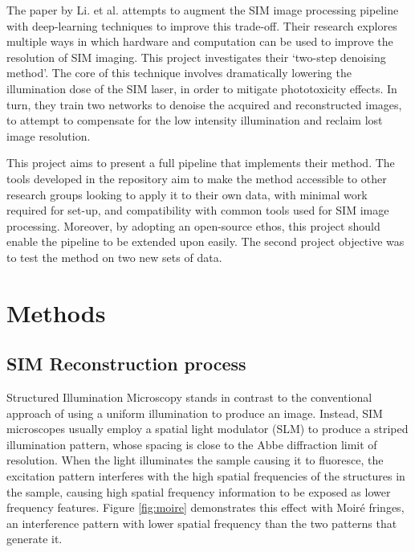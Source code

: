 \documentclass[12pt]{article}
\begin{document}
The paper by Li. et al. \cite{keypaper} attempts to augment the SIM image processing pipeline with deep-learning techniques to improve this trade-off.
Their research explores multiple ways in which hardware and computation can be used to improve the resolution of SIM imaging.
This project investigates their `two-step denoising method'.
The core of this technique involves dramatically lowering the illumination dose of the SIM laser,
in order to mitigate phototoxicity effects.
In turn, they train two networks to denoise the acquired and reconstructed images,
to attempt to compensate for the low intensity illumination and reclaim lost image resolution.

This project aims to present a full pipeline that implements their method.
The tools developed in the repository aim to make the method accessible to other research groups looking to apply it to their own data,
with minimal work required for set-up, and compatibility with common tools used for SIM image processing.
Moreover, by adopting an open-source ethos, this project should enable the pipeline to be extended upon easily.
The second project objective was to test the method on two new sets of data.

\section{Methods}

\subsection{SIM Reconstruction process}

Structured Illumination Microscopy stands in contrast to the conventional approach of using a uniform illumination to produce an image.
Instead, SIM microscopes usually employ a spatial light modulator (SLM) to produce a striped illumination pattern,
whose spacing is close to the Abbe diffraction limit of resolution.
When the light illuminates the sample causing it to fluoresce,
the excitation pattern interferes with the high spatial frequencies of the structures in the sample,
causing high spatial frequency information to be exposed as lower frequency features.
Figure \ref{fig:moire} demonstrates this effect with Moir\'{e} fringes,
an interference pattern with lower spatial frequency than the two patterns that generate it.
\end{document}
